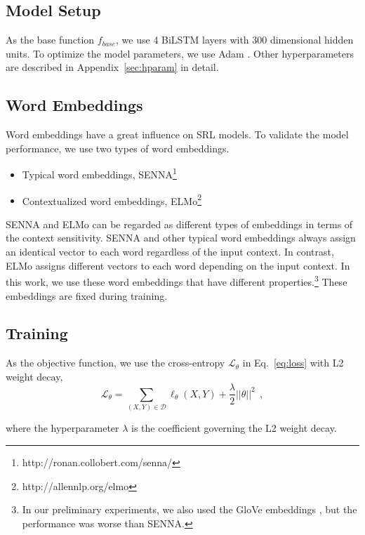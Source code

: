 \documentclass[11pt,a4paper]{article}
\begin{document}
\subsection{Model Setup}
\label{sec:model-setup}
As the base function $f_{base}$, we use 4 BiLSTM layers with 300 dimensional hidden units.
To optimize the model parameters, we use Adam \cite{kingma:14}.
Other hyperparameters are described in Appendix~\ref{sec:hparam} in detail.

\subsection*{\bf Word Embeddings}
Word embeddings have a great influence on SRL models.
To validate the model performance, we use two types of word embeddings.
\begin{itemize}
\setlength{\parskip}{0cm} 
\setlength{\itemsep}{0cm} 
\item Typical word embeddings, SENNA\footnote{http://ronan.collobert.com/senna/} \cite{collobert:11}
\item Contextualized word embeddings, ELMo\footnote{http://allennlp.org/elmo} \cite{peters:18}
\end{itemize}

\noindent
SENNA and ELMo can be regarded as different types of embeddings in terms of the context sensitivity.
SENNA and other typical word embeddings always assign an identical vector to each word regardless of the input context.
In contrast, ELMo assigns different vectors to each word depending on the input context.
In this work, we use these word embeddings that have different properties.\footnote{In our preliminary experiments, we also used the GloVe embeddings \cite{pennington:14}, but the performance was worse than SENNA.}
These embeddings are fixed during training.

\subsection*{Training}
As the objective function, we use the cross-entropy $\mathcal{L}_{\theta}$ in Eq.~\ref{eq:loss} with L2 weight decay,
\begin{equation}
\label{eq:reg}
\mathcal{L}_{\theta} = \sum_{(X, Y) \in \mathcal{D}} \ell_{\theta}(X, Y)+ \frac{\lambda}{2} ||\theta||^2 \:\:,
\end{equation}

\noindent
where the hyperparameter $\lambda$ is the coefficient governing the L2 weight decay.
\end{document}
